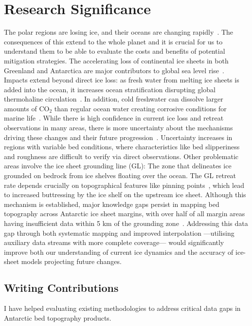 \chapter{Research Significance}
The polar regions are losing ice, and their oceans are changing rapidly~\cite{O_C_in_changingClimate}. The consequences of this extend to the whole planet and it is crucial for us to understand them to be able to evaluate the costs and benefits of potential mitigation strategies. 
The accelerating loss of continental ice sheets in both Greenland and Antarctica are major contributors to global sea level rise~\cite{O_C_in_changingClimate}. Impacts extend beyond direct ice loss: as fresh water from melting ice sheets is added into the ocean, it increases ocean stratification disrupting global thermohaline circulation~\cite{Jacobs_2004}. In addition, cold freshwater can dissolve larger amounts of $\mathrm{CO_2}$ than regular ocean water creating corrosive conditions for marine life~\cite{O_C_in_changingClimate}.
While there is high confidence in current ice loss and retreat observations in many areas, there is more uncertainty about the mechanisms driving these changes and their future progression~\cite{Fox-Kemper_2021}. Uncertainty increases in regions with variable bed conditions, where characteristics like bed slipperiness and roughness are difficult to verify via direct observations. Other problematic areas involve the ice sheet grounding line (GL): The zone that delineates ice grounded on bedrock from ice shelves floating over the ocean. The GL retreat rate depends crucially on topographical features like pinning points~\cite{Fox-Kemper_2021}, which lead to increased buttressing by the ice shelf on the upstream ice sheet. Although this mechanism is established, major knowledge gaps persist in mapping bed topography across Antarctic ice sheet margins, with over half of all margin areas having insufficient data within 5 km of the grounding zone~\cite{RINGS_2022}. Addressing this data gap through both systematic mapping and improved interpolation —utilising auxiliary data streams with more complete coverage— would significantly improve both our understanding of current ice dynamics and the accuracy of ice-sheet models projecting future changes.

\section{Writing Contributions}
I have helped evaluating existing methodologies to address critical data gaps in Antarctic bed topography products. 

